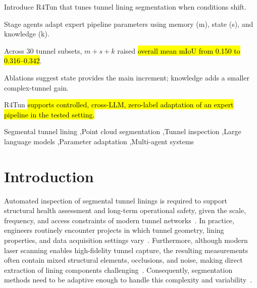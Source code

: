\documentclass[a4paper,fleqn]{cas-dc}
\begin{document}

\begin{highlights}
\item Introduce R4Tun that tunes tunnel lining segmentation when conditions shift.
\item Stage agents adapt expert pipeline parameters using memory (m), state (s), and knowledge (k).
\item Across 30 tunnel subsets, \mbox{$m+s+k$} raised \hl{overall mean mIoU from 0.150 to 0.316--0.342}.
\item Ablations suggest state provides the main increment; knowledge adds a smaller complex-tunnel gain.
\item R4Tun \hl{supports controlled, cross-LLM, zero-label adaptation of an expert pipeline in the tested setting.}
\end
{highlights}


\begin{keywords}
Segmental tunnel lining \sep Point cloud segmentation \sep Tunnel inspection \sep Large language models \sep Parameter adaptation \sep Multi-agent systems
\end{keywords}
\date{\today}

\maketitle

\smallskip

\section{Introduction}\label{sec:intro}


Automated inspection of segmental tunnel linings is required to support structural health assessment and long-term operational safety, given the scale, frequency, and access constraints of modern tunnel networks~\cite{attard2018}. In practice, engineers routinely encounter projects in which tunnel geometry, lining properties, and data acquisition settings vary~\cite{weidner2024generalized}. Furthermore, although modern laser scanning enables high-fidelity tunnel capture, the resulting measurements often contain mixed structural elements, occlusions, and noise, making direct extraction of lining components challenging~\cite{huang2021bim,sjolander2023towards}. Consequently, segmentation methods need to be adaptive enough to handle this complexity and variability~\cite{montero2015, strauss2020sensing}. 
\end{document}
